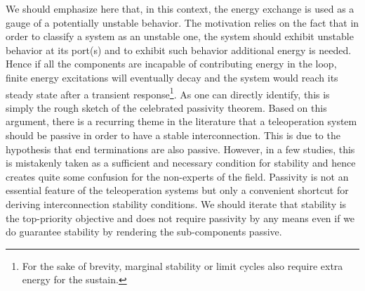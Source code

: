 \begin{rem} We should emphasize here that, in this context, the energy exchange is used as a gauge of a 
potentially unstable behavior. The motivation relies on the fact that in order to classify a system as an 
unstable one, the system should exhibit unstable behavior at its port(s) and to exhibit such behavior 
additional energy is needed. Hence if all the components are incapable of contributing energy in the loop, 
finite energy excitations will eventually decay and the system would reach its steady state after a transient 
response\footnote{For the sake of brevity, marginal stability or limit cycles also require extra energy for 
the sustain.}. As one can directly identify, this is simply the rough sketch of the celebrated passivity theorem. 
Based on this argument, there is a recurring theme in the literature that a teleoperation system should be 
passive in order to have a stable interconnection. This is due to the hypothesis that end terminations are 
also passive. However, in a few studies, this is mistakenly taken as a sufficient and necessary condition 
for stability and hence creates quite some confusion for the non-experts of the field. Passivity is not an 
essential feature of the teleoperation systems but only a convenient shortcut for deriving interconnection 
stability conditions. We should iterate that stability is the top-priority objective and does not require 
passivity by any means even if we do guarantee stability by rendering the sub-components passive. 
\end{rem}

